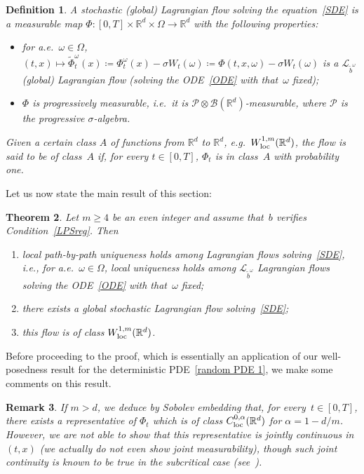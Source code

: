 \documentclass[a4paper,10pt]{article}
\newtheorem{theorem}{Theorem}[section]
\newtheorem{definition}[theorem]{Definition}
\newtheorem{remark}[theorem]{Remark}
\newcommand\1{\mathbbm{1}}
\newcommand{\mc}{\mathcal}
\newcommand{\td}{\tilde}
\newcommand\loc{{\rm loc}}
\numberwithin{equation}{section}
\begin{document}
\begin{definition}
A \emph{stochastic \textup{(}global\textup{)} Lagrangian flow solving the equation~\eqref{SDE}} is a measurable map $\Phi \colon [0,T]\times\mathbb{R}^d\times\Omega\rightarrow\mathbb{R}^d$ with the following properties:  
\begin{itemize}
\item for a.e.~$\omega \in \Omega$, $(t,x) \mapsto \td{\Phi}^\omega_t(x)\coloneqq \Phi_t^\omega(x) -\sigma W_t(\omega) \coloneqq \Phi(t,x,\omega)-\sigma W_t(\omega)$ is a $\mc{L}_{\td{b}^\omega}$ \textup{(}global\textup{)} Lagrangian flow \textup{(}solving the ODE~\eqref{ODE} with that~$\omega$ fixed\textup{)};
\item $\Phi$ is progressively measurable, i.e.~it is $\mc{P}\otimes\mc{B}(\mathbb{R}^d)$-measurable, where $\mc{P}$ is the progressive $\sigma$-algebra.
\end{itemize}
Given a certain class $A$ of functions from $\mathbb{R}^d$ to $\mathbb{R}^d$, e.g.~$W^{1,m}_{\loc}(\mathbb{R}^d)$, the flow is said to be of class~$A$ if, for every $t \in [0,T]$, $\Phi_t$ is in class~$A$ with probability one.
\end{definition}

Let us now state the main result of this section:

\begin{theorem}\label{main thm flows}
Let $m \geq 4$ be an even integer and assume that~$b$ verifies Condition~\ref{LPSreg}. Then  
\begin{enumerate}[font=\normalfont]
\item local path-by-path uniqueness holds among Lagrangian flows solving~\eqref{SDE}, i.e., for a.e.~$\omega \in \Omega$, local uniqueness holds among $\mc{L}_{\td{b}^\omega}$ Lagrangian flows solving the ODE~\eqref{ODE} with that~$\omega$ fixed; 
\item there exists a global stochastic Lagrangian flow solving~\eqref{SDE};
\item this flow is of class $W^{1,m}_{\loc}(\mathbb{R}^d)$.
\end{enumerate}
\end{theorem}

Before proceeding to the proof, which is essentially an application of our well-posedness result for the deterministic PDE~\eqref{random PDE 1}, we make some comments on this result. 

\begin{remark}
If $m>d$, we deduce by Sobolev embedding that, for every~$t \in [0,T]$, there exists a representative of $\Phi_t$ which is of class $C^{0,\alpha}_{\loc}(\mathbb{R}^d)$ for $\alpha=1-d/m$. However, we are not able to show that this representative is jointly continuous in $(t,x)$ \textup{(}we actually do not even show joint measurability\textup{)}, though such joint continuity is known to be true in the subcritical case \textup{(}see~\textup{\cite{FEDFLA11}}\textup{)}.
\end{remark}
\end{document}

